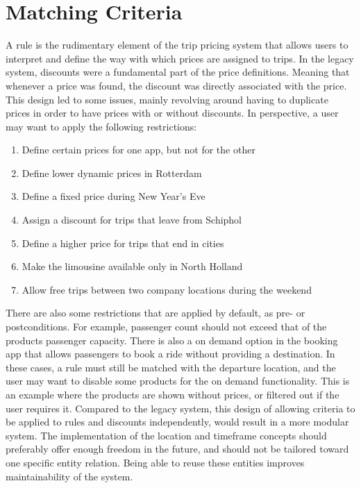 \section{Matching Criteria}
A rule is the rudimentary element of the trip pricing system that allows users to interpret and define the way with which prices are assigned to trips. In the legacy system, discounts were a fundamental part of the price definitions. Meaning that whenever a price was found, the discount was directly associated with the price. This design led to some issues, mainly revolving around having to duplicate prices in order to have prices with or without discounts. In perspective, a user may want to apply the following restrictions:

\begin{enumerate}
	\item Define certain prices for one app, but not for the other
	\item Define lower dynamic prices in Rotterdam
	\item Define a fixed price during New Year's Eve
	\item Assign a discount for trips that leave from Schiphol
	\item Define a higher price for trips that end in cities
	\item Make the limousine available only in North Holland
	\item Allow free trips between two company locations during the weekend
\end{enumerate}

There are also some restrictions that are applied by default, as pre- or  postconditions. For example, passenger count should not exceed that of the products passenger capacity. There is also a on demand option in the booking app that allows passengers to book a ride without providing a destination. In these cases, a rule must still be matched with the departure location, and the user may want to disable some products for the on demand functionality. This is an example where the products are shown without prices, or filtered out if the user requires it. Compared to the legacy system, this design of allowing criteria to be applied to rules and discounts independently, would result in a more modular system. The implementation of the location and timeframe concepts should preferably offer enough freedom in the future, and should not be tailored toward one specific entity relation. Being able to reuse these entities improves maintainability of the system.


